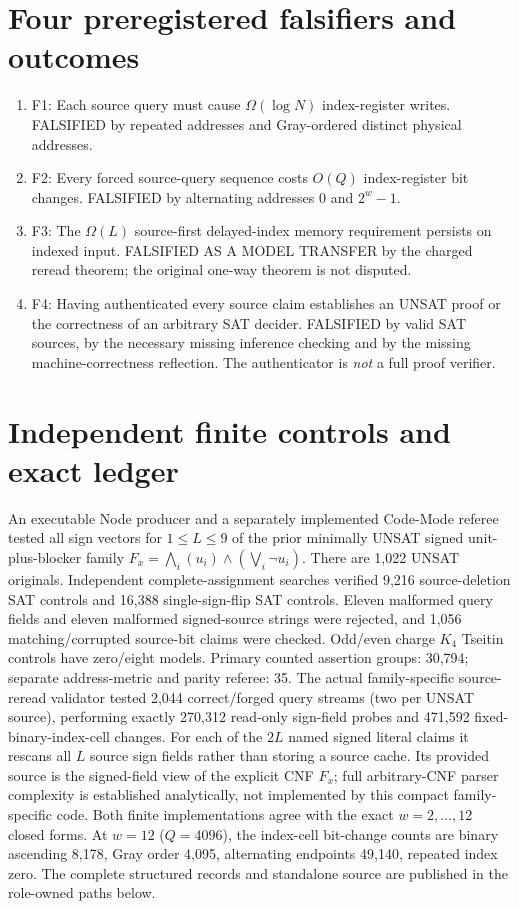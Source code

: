 \documentclass[11pt]{article}
\begin{document}
\section*{Four preregistered falsifiers and outcomes}
\begin{enumerate}
\item[] F1: Each source query must cause $\Omega(\log N)$ index-register writes. FALSIFIED by repeated addresses and Gray-ordered distinct physical addresses.
\item[] F2: Every forced source-query sequence costs $O(Q)$ index-register bit changes. FALSIFIED by alternating addresses $0$ and $2^w-1$.
\item[] F3: The $\Omega(L)$ source-first delayed-index memory requirement persists on indexed input. FALSIFIED AS A MODEL TRANSFER by the charged reread theorem; the original one-way theorem is not disputed.
\item[] F4: Having authenticated every source claim establishes an UNSAT proof or the correctness of an arbitrary SAT decider. FALSIFIED by valid SAT sources, by the necessary missing inference checking and by the missing machine-correctness reflection. The authenticator is \emph{not} a full proof verifier.
\end{enumerate}

\section*{Independent finite controls and exact ledger}
An executable Node producer and a separately implemented Code-Mode referee tested all sign vectors for $1\le L\le9$ of the prior minimally UNSAT signed unit-plus-blocker family $F_x=\bigwedge_i(u_i)\wedge(\bigvee_i\neg u_i)$. There are 1,022 UNSAT originals. Independent complete-assignment searches verified 9,216 source-deletion SAT controls and 16,388 single-sign-flip SAT controls. Eleven malformed query fields and eleven malformed signed-source strings were rejected, and 1,056 matching/corrupted source-bit claims were checked. Odd/even charge $K_4$ Tseitin controls have zero/eight models. Primary counted assertion groups: 30,794; separate address-metric and parity referee: 35. The actual family-specific source-reread validator tested 2,044 correct/forged query streams (two per UNSAT source), performing exactly 270,312 read-only sign-field probes and 471,592 fixed-binary-index-cell changes. For each of the $2L$ named signed literal claims it rescans all $L$ source sign fields rather than storing a source cache. Its provided source is the signed-field view of the explicit CNF $F_x$; full arbitrary-CNF parser complexity is established analytically, not implemented by this compact family-specific code. Both finite implementations agree with the exact $w=2,\ldots,12$ closed forms. At $w=12$ ($Q=4096$), the index-cell bit-change counts are binary ascending 8,178, Gray order 4,095, alternating endpoints 49,140, repeated index zero. The complete structured records and standalone source are published in the role-owned paths below.
\end{document}
